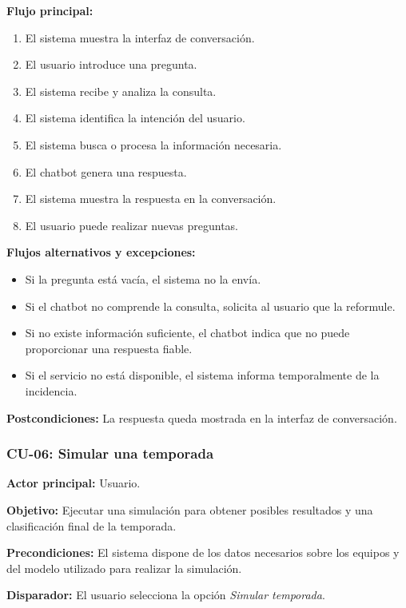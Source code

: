 \noindent \textbf{Flujo principal:}
\begin{enumerate}
    \item El sistema muestra la interfaz de conversación.
    \item El usuario introduce una pregunta.
    \item El sistema recibe y analiza la consulta.
    \item El sistema identifica la intención del usuario.
    \item El sistema busca o procesa la información necesaria.
    \item El chatbot genera una respuesta.
    \item El sistema muestra la respuesta en la conversación.
    \item El usuario puede realizar nuevas preguntas.
\end{enumerate}

\noindent \textbf{Flujos alternativos y excepciones:}
\begin{itemize}
    \item Si la pregunta está vacía, el sistema no la envía.
    \item Si el chatbot no comprende la consulta, solicita al usuario que la reformule.
    \item Si no existe información suficiente, el chatbot indica que no puede proporcionar una respuesta fiable.
    \item Si el servicio no está disponible, el sistema informa temporalmente de la incidencia.
\end{itemize}

\noindent \textbf{Postcondiciones:} La respuesta queda mostrada en la interfaz de conversación.

\subsubsection{CU-06: Simular una temporada}

\noindent \textbf{Actor principal:} Usuario.

\noindent \textbf{Objetivo:} Ejecutar una simulación para obtener posibles resultados y una clasificación final de la temporada.

\noindent \textbf{Precondiciones:} El sistema dispone de los datos necesarios sobre los equipos y del modelo utilizado para realizar la simulación.

\noindent \textbf{Disparador:} El usuario selecciona la opción \textit{Simular temporada}.

